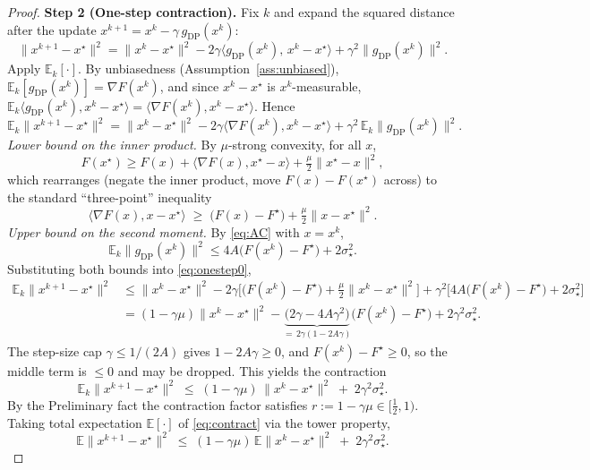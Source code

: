 \begin{proof}
\medskip
\noindent\textbf{Step 2 (One-step contraction).}
Fix $k$ and expand the squared distance after the update $x^{k+1}=x^k-\gamma\,g_{\mathrm{DP}}(x^k)$:
\[
\|x^{k+1}-x^\star\|^2
=\|x^k-x^\star\|^2-2\gamma\big\langle g_{\mathrm{DP}}(x^k),\,x^k-x^\star\big\rangle+\gamma^2\big\|g_{\mathrm{DP}}(x^k)\big\|^2.
\]
Apply $\mathbb E_k[\cdot]$. By unbiasedness (Assumption~\ref{ass:unbiased}), $\mathbb E_k[g_{\mathrm{DP}}(x^k)]=\nabla F(x^k)$, and since $x^k-x^\star$ is $x^k$-measurable, $\mathbb E_k\langle g_{\mathrm{DP}}(x^k),x^k-x^\star\rangle=\langle\nabla F(x^k),x^k-x^\star\rangle$. Hence
\begin{equation}\label{eq:onestep0}
\mathbb E_k\|x^{k+1}-x^\star\|^2
=\|x^k-x^\star\|^2-2\gamma\big\langle\nabla F(x^k),x^k-x^\star\big\rangle+\gamma^2\,\mathbb E_k\big\|g_{\mathrm{DP}}(x^k)\big\|^2.
\end{equation}
\emph{Lower bound on the inner product.} By $\mu$-strong convexity, for all $x$,
\[
F(x^\star)\ge F(x)+\langle\nabla F(x),x^\star-x\rangle+\tfrac{\mu}{2}\|x^\star-x\|^2,
\]
which rearranges (negate the inner product, move $F(x)-F(x^\star)$ across) to the standard ``three-point'' inequality
\begin{equation}\label{eq:scvx}
\big\langle\nabla F(x),x-x^\star\big\rangle\;\ge\;\big(F(x)-F^\star\big)+\tfrac{\mu}{2}\|x-x^\star\|^2 .
\end{equation}
\emph{Upper bound on the second moment.} By \eqref{eq:AC} with $x=x^k$,
\[
\mathbb E_k\big\|g_{\mathrm{DP}}(x^k)\big\|^2\le 4A\big(F(x^k)-F^\star\big)+2\sigma_\star^2 .
\]
Substituting both bounds into \eqref{eq:onestep0},
\begin{align*}
\mathbb E_k\|x^{k+1}-x^\star\|^2
&\le \|x^k-x^\star\|^2-2\gamma\Big[\big(F(x^k)-F^\star\big)+\tfrac{\mu}{2}\|x^k-x^\star\|^2\Big]
+\gamma^2\Big[4A\big(F(x^k)-F^\star\big)+2\sigma_\star^2\Big]\\[2pt]
&=(1-\gamma\mu)\|x^k-x^\star\|^2
-\underbrace{\big(2\gamma-4A\gamma^2\big)}_{=\,2\gamma(1-2A\gamma)}\big(F(x^k)-F^\star\big)
+2\gamma^2\sigma_\star^2 .
\end{align*}
The step-size cap $\gamma\le 1/(2A)$ gives $1-2A\gamma\ge0$, and $F(x^k)-F^\star\ge0$, so the middle term is $\le0$ and may be dropped. This yields the contraction
\begin{equation}\label{eq:contract}
\mathbb E_k\|x^{k+1}-x^\star\|^2\;\le\;(1-\gamma\mu)\,\|x^k-x^\star\|^2\;+\;2\gamma^2\sigma_\star^2 .
\end{equation}
By the Preliminary fact the contraction factor satisfies $r:=1-\gamma\mu\in[\tfrac12,1)$. Taking total expectation $\mathbb E[\cdot]$ of \eqref{eq:contract} via the tower property,
\begin{equation}\label{eq:recursion}
\mathbb E\|x^{k+1}-x^\star\|^2\;\le\;(1-\gamma\mu)\,\mathbb E\|x^k-x^\star\|^2\;+\;2\gamma^2\sigma_\star^2 .
\end{equation}


\end{proof}
